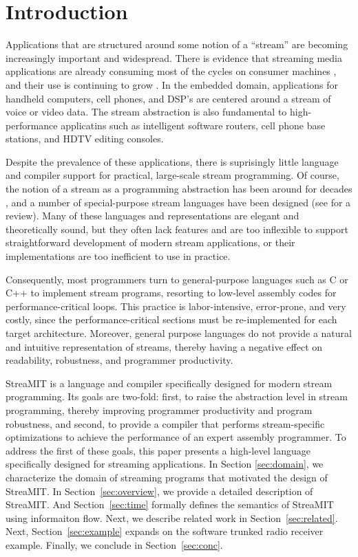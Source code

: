 \section{Introduction}

Applications that are structured around some notion of a ``stream''
are becoming increasingly important and widespread.  There is evidence
that streaming media applications are already consuming most of the
cycles on consumer machines \cite{Rix98}, and their use is continuing
to grow \cite{someone}.  In the embedded domain, applications for
handheld computers, cell phones, and DSP's are centered around a
stream of voice or video data.  The stream abstraction is also
fundamental to high-performance applicatins such as intelligent
software routers, cell phone base stations, and HDTV editing consoles.

Despite the prevalence of these applications, there is suprisingly
little language and compiler support for practical, large-scale stream
programming.  Of course, the notion of a stream as a programming
abstraction has been around for decades \cite{SICP}, and a number of
special-purpose stream languages have been designed (see
\cite{survey97} for a review).  Many of these languages and
representations are elegant and theoretically sound, but they often
lack features and are too inflexible to support straightforward
development of modern stream applications, or their implementations
are too inefficient to use in practice.

Consequently, most programmers turn to general-purpose languages such
as C or C++ to implement stream programs, resorting to low-level
assembly codes for performance-critical loops.  This practice is
labor-intensive, error-prone, and very costly, since the
performance-critical sections must be re-implemented for each target
architecture.  Moreover, general purpose languages do not provide a
natural and intuitive representation of streams, thereby having a
negative effect on readability, robustness, and programmer
productivity.

StreaMIT is a language and compiler specifically designed for modern
stream programming.  Its goals are two-fold: first, to raise the
abstraction level in stream programming, thereby improving programmer
productivity and program robustness, and second, to provide a compiler
that performs stream-specific optimizations to achieve the performance
of an expert assembly programmer.  To address the first of these
goals, this paper presents a high-level language specifically designed
for streaming applications.  In Section {\ref{sec:domain}}, we
characterize the domain of streaming programs that motivated the
design of StreaMIT.  In Section~\ref{sec:overview}, we provide a
detailed description of StreaMIT. And Section~\ref{sec:time} formally
defines the semantics of StreaMIT using informaiton flow. Next, we
describe related work in Section~\ref{sec:related}.  Next,
Section~\ref{sec:example} expands on the software trunked radio
receiver example. Finally, we conclude in Section~\ref{sec:conc}.



